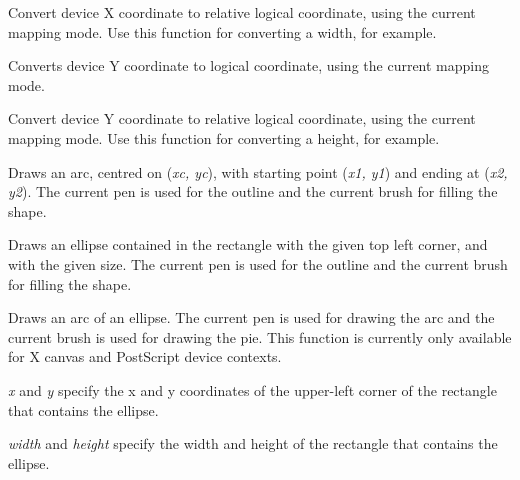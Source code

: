 Convert device X coordinate to relative logical coordinate, using the current
mapping mode. Use this function for converting a width, for example.

\label{wxdcdevicetologicaly}


Converts device Y coordinate to logical coordinate, using the current
mapping mode.

\label{wxdcdevicetologicalyrel}


Convert device Y coordinate to relative logical coordinate, using the current
mapping mode. Use this function for converting a height, for example.



Draws an arc, centred on ({\it xc, yc}), with starting point ({\it x1, y1})
and ending at ({\it x2, y2}).   The current pen is used for the outline
and the current brush for filling the shape.



Draws an ellipse contained in the rectangle with the given top left corner, and with the
given size.  The current pen is used for the outline and the current brush for
filling the shape.



Draws an arc of an ellipse. The current pen is used for drawing the arc and 
the current brush is used for drawing the pie. This function is currently only available for
X canvas and PostScript device contexts.

{\it x} and {\it y} specify the x and y coordinates of the upper-left corner of the rectangle that contains
the ellipse.

{\it width} and {\it height} specify the width and height of the rectangle that contains 
the ellipse.

